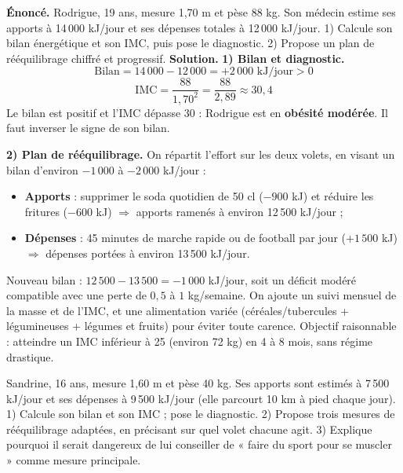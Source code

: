 \documentclass[11pt]{article}
\begin{document}
\begin{exoresolu}
\textbf{Énoncé.} Rodrigue, 19 ans, mesure 1,70 m et pèse 88 kg. Son médecin estime ses apports à 14\,000 kJ/jour et ses dépenses totales à 12\,000 kJ/jour. 1) Calcule son bilan énergétique et son IMC, puis pose le diagnostic. 2) Propose un plan de rééquilibrage chiffré et progressif.
\tcblower
\textbf{Solution.}
\textbf{1) Bilan et diagnostic.}
\[ \text{Bilan} = 14\,000 - 12\,000 = +2\,000 \text{ kJ/jour} > 0 \]
\[ \text{IMC} = \frac{88}{1,70^2} = \frac{88}{2,89} \approx 30,4 \]
Le bilan est positif et l'IMC dépasse 30 : Rodrigue est en \textbf{obésité modérée}. Il faut inverser le signe de son bilan.

\textbf{2) Plan de rééquilibrage.} On répartit l'effort sur les deux volets, en visant un bilan d'environ $-1\,000$ à $-2\,000$ kJ/jour :
\begin{itemize}
\item \textbf{Apports} : supprimer le soda quotidien de 50 cl ($-900$ kJ) et réduire les fritures ($-600$ kJ) $\Rightarrow$ apports ramenés à environ 12\,500 kJ/jour ;
\item \textbf{Dépenses} : 45 minutes de marche rapide ou de football par jour ($+1\,500$ kJ) $\Rightarrow$ dépenses portées à environ 13\,500 kJ/jour.
\end{itemize}
Nouveau bilan : $12\,500 - 13\,500 = -1\,000$ kJ/jour, soit un déficit modéré compatible avec une perte de $0,5$ à $1$ kg/semaine. On ajoute un suivi mensuel de la masse et de l'IMC, et une alimentation variée (céréales/tubercules + légumineuses + légumes et fruits) pour éviter toute carence. Objectif raisonnable : atteindre un IMC inférieur à 25 (environ 72 kg) en 4 à 8 mois, sans régime drastique.
\end{exoresolu}

\begin{exercice}
Sandrine, 16 ans, mesure 1,60 m et pèse 40 kg. Ses apports sont estimés à 7\,500 kJ/jour et ses dépenses à 9\,500 kJ/jour (elle parcourt 10 km à pied chaque jour). 1) Calcule son bilan et son IMC ; pose le diagnostic. 2) Propose trois mesures de rééquilibrage adaptées, en précisant sur quel volet chacune agit. 3) Explique pourquoi il serait dangereux de lui conseiller de « faire du sport pour se muscler » comme mesure principale.
\end{exercice}
\end{document}
